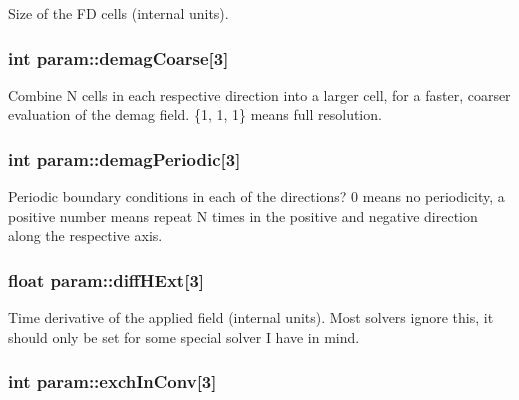 Size of the FD cells (internal units). 

\hypertarget{structparam_acb7eede771afb6d638df885f9ac67701}{
\subsubsection[{demagCoarse}]{\setlength{\rightskip}{0pt plus 5cm}int {\bf param::demagCoarse}\mbox{[}3\mbox{]}}}
\label{structparam_acb7eede771afb6d638df885f9ac67701}


Combine N cells in each respective direction into a larger cell, for a faster, coarser evaluation of the demag field. \{1, 1, 1\} means full resolution. 

\hypertarget{structparam_a86db590d75a57deb605c162263f8f696}{
\subsubsection[{demagPeriodic}]{\setlength{\rightskip}{0pt plus 5cm}int {\bf param::demagPeriodic}\mbox{[}3\mbox{]}}}
\label{structparam_a86db590d75a57deb605c162263f8f696}


Periodic boundary conditions in each of the directions? 0 means no periodicity, a positive number means repeat N times in the positive and negative direction along the respective axis. 

\hypertarget{structparam_a622d7704eddc40f2cddc2cd7dfa5f235}{
\subsubsection[{diffHExt}]{\setlength{\rightskip}{0pt plus 5cm}float {\bf param::diffHExt}\mbox{[}3\mbox{]}}}
\label{structparam_a622d7704eddc40f2cddc2cd7dfa5f235}


Time derivative of the applied field (internal units). Most solvers ignore this, it should only be set for some special solver I have in mind. 

\hypertarget{structparam_a557e842de84dc1a97295b1fa53700ec7}{
\subsubsection[{exchInConv}]{\setlength{\rightskip}{0pt plus 5cm}int {\bf param::exchInConv}\mbox{[}3\mbox{]}}}
\label{structparam_a557e842de84dc1a97295b1fa53700ec7}


